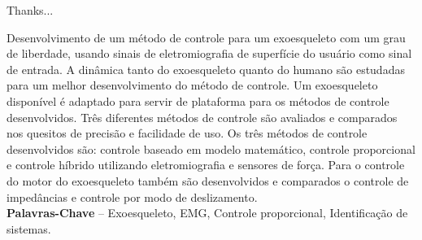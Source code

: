 \documentclass[]{politex}
\begin{document}
\capa
\falsafolhaderosto
\folhaderosto








\begin{agradecimentos}

Thanks...



\end{agradecimentos}




\begin{resumo}
Desenvolvimento de um método de controle para um exoesqueleto com um grau de liberdade, usando sinais de eletromiografia de superfície do usuário como sinal de entrada. A dinâmica tanto do exoesqueleto quanto do humano são estudadas para um melhor desenvolvimento do método de controle. Um exoesqueleto disponível é adaptado para servir de plataforma para os métodos de controle desenvolvidos. Três diferentes métodos de controle são avaliados e comparados nos quesitos de precisão e facilidade de uso. Os três métodos de controle desenvolvidos são: controle baseado em modelo matemático, controle proporcional e controle híbrido utilizando eletromiografia e sensores de força. Para o controle do motor do exoesqueleto também são desenvolvidos e comparados o controle de impedâncias e controle por modo de deslizamento.
%
\\[3\baselineskip]
%
\textbf{Palavras-Chave} -- Exoesqueleto, EMG, Controle proporcional, Identificação de sistemas.
\end{resumo}
\end{document}
